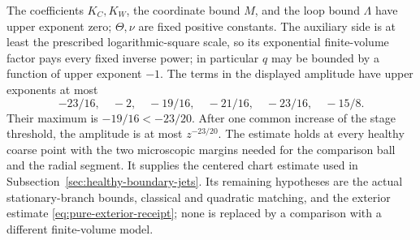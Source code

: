 The coefficients $K_C,K_W$, the coordinate bound $M$, and the
loop bound $\Lambda$ have upper exponent zero; $\Theta,\nu$ are
fixed positive constants. The auxiliary
side is at least the prescribed logarithmic-square scale, so its
exponential finite-volume factor pays every fixed inverse power;
in particular $q$ may be bounded by a function of upper exponent
$-1$. The terms in the displayed amplitude have upper exponents
at most
\[
          -23/16,\quad -2,\quad -19/16,\quad
                         -21/16,\quad -23/16,\quad -15/8.
\]
Their maximum is $-19/16<-23/20$. After one common increase of the
stage threshold, the amplitude is at most $z^{-23/20}$.
The estimate holds at every healthy coarse point with the two
microscopic margins needed for the comparison ball and the radial
segment. It supplies the centered chart estimate used in
Subsection~\ref{sec:healthy-boundary-jets}. Its remaining hypotheses are
the actual stationary-branch bounds, classical and quadratic
matching, and the exterior estimate
\eqref{eq:pure-exterior-receipt}; none is replaced by a comparison
with a different finite-volume model.
